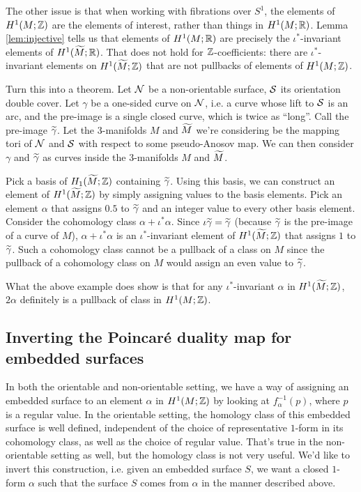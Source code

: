 The other issue is that when working with fibrations over $S^1$, the elements of $H^1(M; \mathbb{Z})$ are
the elements of interest, rather than things in $H^1(M; \mathbb{R})$. Lemma \ref{lem:injective} tells us
that elements of $H^1(M; \mathbb{R})$ are precisely the $\iota^{\ast}$-invariant elements of
$H^1(\widetilde{M}; \mathbb{R})$. That does not hold for $\mathbb{Z}$-coefficients: there are $\iota^{\ast}$-invariant
elements on $H^1(\widetilde{M}; \mathbb{Z})$ that are not pullbacks of elements of $H^1(M; \mathbb{Z})$.
\begin{example}
  {\color{red} Turn this into a theorem.}
  Let $\mathcal{N}$ be a non-orientable surface, $\mathcal{S}$ its orientation double cover. Let $\gamma$ be a
  one-sided curve on $\mathcal{N}$, i.e. a curve whose lift to $\mathcal{S}$ is an arc, and the pre-image is a
  single closed curve, which is twice as ``long''. Call the pre-image $\widetilde{\gamma}$. Let the
  $3$-manifolds $M$ and $\widetilde{M}$ we're considering be the mapping tori of $\mathcal{N}$ and $\mathcal{S}$ with
  respect to some pseudo-Anosov map. We can then consider $\gamma$ and $\widetilde{\gamma}$ as curves
  inside the $3$-manifolds $M$ and $\widetilde{M}$.

  Pick a basis of $H_1(\widetilde{M}; \mathbb{Z})$ containing $\widetilde{\gamma}$. Using this basis, we can construct an
  element of $H^1(\widetilde{M}; \mathbb{Z})$ by simply assigning values to the basis elements.  Pick an element
  $\alpha$ that assigns $0.5$ to $\widetilde{\gamma}$ and an integer value to every other basis
  element. Consider the cohomology class $\alpha + \iota^{\ast}\alpha$. Since
  $\iota \widetilde{\gamma} = \widetilde{\gamma}$ (because $\widetilde{\gamma}$ is the pre-image of a curve of $M$),
  $\alpha + \iota^{\ast}\alpha$ is an $\iota^{\ast}$-invariant element of $H^1(\widetilde{M}; \mathbb{Z})$ that
  assigns $1$ to $\widetilde{\gamma}$. Such a cohomology class cannot be a pullback of a class on $M$ since
  the pullback of a cohomology class on $M$ would assign an even value to $\widetilde{\gamma}$.
\end{example}

What the above example does show is that for any $\iota^{\ast}$-invariant $\alpha$ in
$H^1(\widetilde{M}; \mathbb{Z})$, $2\alpha$ definitely is a pullback of class in $H^1(M; \mathbb{Z})$.

\subsection{Inverting the Poincar\'e duality map for embedded surfaces}
\label{sec:invert-poincare}

In both the orientable and non-orientable setting, we have a way of assigning an embedded surface
to an element $\alpha$ in $H^1(M; \mathbb{Z})$ by looking at $f_{\alpha}^{-1}(p)$, where $p$ is a regular
value. In the orientable setting, the homology class of this embedded surface is well defined,
independent of the choice of representative $1$-form in its cohomology class, as well as the choice
of regular value. That's true in the non-orientable setting as well, but the homology class is not
very useful. We'd like to invert this construction, i.e. given an embedded surface $S$, we want a
closed $1$-form $\alpha$ such that the surface $S$ comes from $\alpha$ in the manner described
above.

